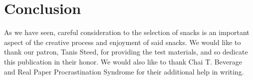 \section{Conclusion}

As we have seen, careful consideration to the selection of snacks is an important aspect of the creative process and enjoyment of said snacks.
We would like to thank our patron, Tanis Steed, for providing the test materials, and so dedicate this publication in their honor.
We would also like to thank Chai T. Beverage and Real Paper Procrastination Syndrome for their additional help in writing.
